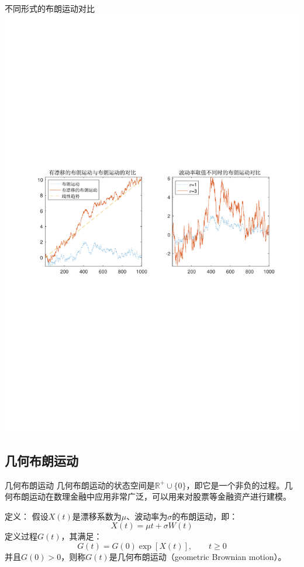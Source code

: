 \documentclass[t]{beamer}
\begin{document}
\begin{frame}{不同形式的布朗运动对比}
  \centering 
	\includegraphics[height=.65\textheight]{fig/drift.pdf}
\end{frame}

\subsection{几何布朗运动}
\begin{frame}{几何布朗运动}
  几何布朗运动的状态空间是$\mathbb{R}^+\cup\{0\}$，即它是一个非负的过程。几何布朗运动在数理金融中应用非常广泛，可以用来对股票等金融资产进行建模。
\normalsize
  \begin{block}{定义：}
    假设$X(t)$是漂移系数为$\mu$、波动率为$\sigma$的布朗运动，即：
    \[X(t)=\mu t+\sigma W(t) \]
    定义过程$G(t)$，其满足：
    \begin{equation*}
    G(t)=G(0)\exp[X(t)],\qquad t\ge 0
    \end{equation*}
    并且$G(0)>0$，则称$G(t)$是几何布朗运动（geometric Brownian motion）。 
  \end{block}
\end{frame}
\end{document}
